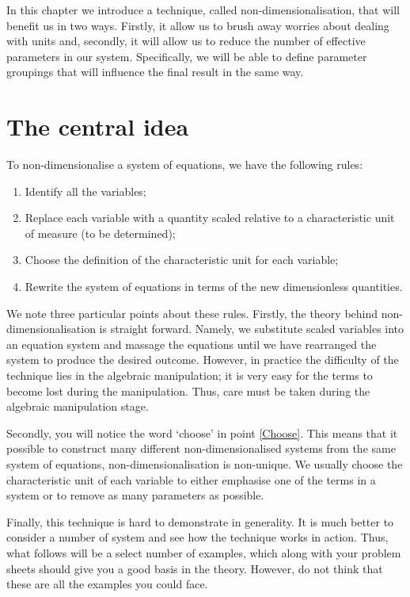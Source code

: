In this chapter we introduce a technique, called non-dimensionalisation, that will benefit us in two ways. Firstly, it allow us to brush away worries about dealing with units and, secondly, it will allow us to reduce the number of effective parameters in our system. Specifically, we will be able to define parameter groupings that will influence the final result in the same way.

\section{The central idea}
To non-dimensionalise a system of equations, we have the following rules:
\begin{enumerate}
\item Identify all the variables;
\item Replace each variable with a quantity scaled relative to a characteristic unit of measure (to be determined);
\item Choose the definition of the characteristic unit for each variable;\label{Choose}
\item Rewrite the system of equations in terms of the new dimensionless quantities.
\end{enumerate}
We note three particular points about these rules. Firstly, the theory behind non-dimensionalisation is straight forward. Namely, we substitute scaled variables into an equation system and massage the equations until we have rearranged the system to produce the desired outcome. However, in practice the difficulty of the technique lies in the algebraic manipulation; it is very easy for the terms to become lost during the manipulation. Thus, care must be taken during the algebraic manipulation stage.

Secondly, you will notice the word `choose' in point \ref{Choose}. This means that it possible to construct many different non-dimensionalised systems from the same system of equations, \ie non-dimensionalisation is non-unique. We usually choose the characteristic unit of each variable to either emphasise one of the terms in a system or to remove as many parameters as possible.

Finally, this technique is hard to demonstrate in generality. It is much better to consider a number of system and see how the technique works in action. Thus, what follows will be a select number of examples, which along with your problem sheets should give you a good basis in the theory. However, do not think that these are all the examples you could face.

